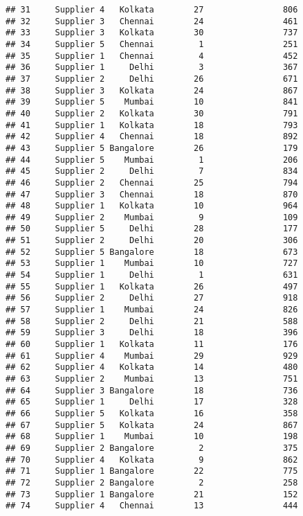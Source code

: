 \documentclass[
]{article}
\begin{document}
\begin{verbatim}
## 31     Supplier 4   Kolkata        27                806
## 32     Supplier 3   Chennai        24                461
## 33     Supplier 3   Kolkata        30                737
## 34     Supplier 5   Chennai         1                251
## 35     Supplier 1   Chennai         4                452
## 36     Supplier 1     Delhi         3                367
## 37     Supplier 2     Delhi        26                671
## 38     Supplier 3   Kolkata        24                867
## 39     Supplier 5    Mumbai        10                841
## 40     Supplier 2   Kolkata        30                791
## 41     Supplier 1   Kolkata        18                793
## 42     Supplier 4   Chennai        18                892
## 43     Supplier 5 Bangalore        26                179
## 44     Supplier 5    Mumbai         1                206
## 45     Supplier 2     Delhi         7                834
## 46     Supplier 2   Chennai        25                794
## 47     Supplier 3   Chennai        18                870
## 48     Supplier 1   Kolkata        10                964
## 49     Supplier 2    Mumbai         9                109
## 50     Supplier 5     Delhi        28                177
## 51     Supplier 2     Delhi        20                306
## 52     Supplier 5 Bangalore        18                673
## 53     Supplier 1    Mumbai        10                727
## 54     Supplier 1     Delhi         1                631
## 55     Supplier 1   Kolkata        26                497
## 56     Supplier 2     Delhi        27                918
## 57     Supplier 1    Mumbai        24                826
## 58     Supplier 2     Delhi        21                588
## 59     Supplier 3     Delhi        18                396
## 60     Supplier 1   Kolkata        11                176
## 61     Supplier 4    Mumbai        29                929
## 62     Supplier 4   Kolkata        14                480
## 63     Supplier 2    Mumbai        13                751
## 64     Supplier 3 Bangalore        18                736
## 65     Supplier 1     Delhi        17                328
## 66     Supplier 5   Kolkata        16                358
## 67     Supplier 5   Kolkata        24                867
## 68     Supplier 1    Mumbai        10                198
## 69     Supplier 2 Bangalore         2                375
## 70     Supplier 4   Kolkata         9                862
## 71     Supplier 1 Bangalore        22                775
## 72     Supplier 2 Bangalore         2                258
## 73     Supplier 1 Bangalore        21                152
## 74     Supplier 4   Chennai        13                444

\end{verbatim}
\end{document}
